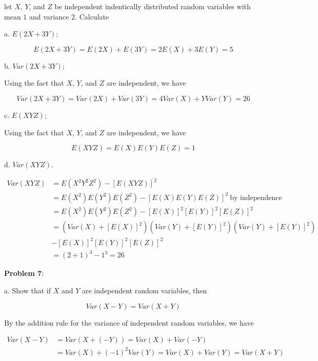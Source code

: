\documentclass{article}
\begin{document}
let $X$, $Y$, and $Z$ be independent indentically distributed random variables with mean $1$ and variance $2$. Calculate

\indent\indent a. $E(2X+3Y)$;

{\color{blue}

\[E(2X+3Y)=E(2X)+E(3Y)=2E(X)+3E(Y)=5\]

}

\indent\indent b. $Var(2X+3Y)$;

{\color{blue}

Using the fact that $X$, $Y$, and $Z$ are independent, we have

\[Var(2X+3Y)=Var(2X)+Var(3Y)=4Var(X)+YVar(Y)=26\]

}

\indent\indent c. $E(XYZ)$;

{\color{blue}

Using the fact that $X$, $Y$, and $Z$ are independent, we have

\[E(XYZ)=E(X)E(Y)E(Z)=1\]

}

\indent\indent d. $Var(XYZ)$.

{\color{blue}

\begin{align*}
    Var(XYZ)&=E(X^2Y^2Z^2)-[E(XYZ)]^2\\
    &=E(X^2)E(Y^2)E(Z^2)-[E(X)E(Y)E(Z)]^2\ \text{by independence}\\
    &=E(X^2)E(Y^2)E(Z^2)-[E(X)]^2[E(Y)]^2[E(Z)]^2\\
    &=(Var(X)+[E(X)]^2)(Var(Y)+[E(Y)]^2)(Var(Y)+[E(Y)]^2)\\
    &-[E(X)]^2[E(Y)]^2[E(Z)]^2\\
    &=(2+1)^3-1^3=26
\end{align*}

}

\noindent\textbf{Problem 7}:

\indent\indent a. Show that if $X$ and $Y$ are independent random variables, then

\[Var(X-Y)=Var(X+Y)\]

{\color{blue}

By the addition rule for the variance of independent random variables, we have

\begin{align*}
    Var(X-Y)&=Var(X+(-Y))=Var(X)+Var(-Y)\\
    &=Var(X)+(-1)^2Var(Y)=Var(X)+Var(Y)=Var(X+Y)
\end{align*}

}
\end{document}
